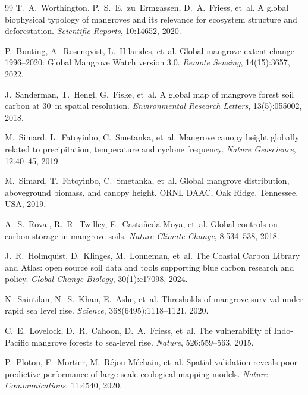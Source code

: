 \begin{thebibliography}{99}
T.~A.~Worthington, P.~S.~E.~zu~Ermgassen, D.~A.~Friess, et~al.
\newblock A global biophysical typology of mangroves and its relevance for ecosystem structure and deforestation.
\newblock \emph{Scientific Reports}, 10:14652, 2020.

P.~Bunting, A.~Rosenqvist, L.~Hilarides, et~al.
\newblock Global mangrove extent change 1996--2020: Global Mangrove Watch version 3.0.
\newblock \emph{Remote Sensing}, 14(15):3657, 2022.

J.~Sanderman, T.~Hengl, G.~Fiske, et~al.
\newblock A global map of mangrove forest soil carbon at 30~m spatial resolution.
\newblock \emph{Environmental Research Letters}, 13(5):055002, 2018.

M.~Simard, L.~Fatoyinbo, C.~Smetanka, et~al.
\newblock Mangrove canopy height globally related to precipitation, temperature and cyclone frequency.
\newblock \emph{Nature Geoscience}, 12:40--45, 2019.

M.~Simard, T.~Fatoyinbo, C.~Smetanka, et~al.
\newblock Global mangrove distribution, aboveground biomass, and canopy height.
\newblock ORNL DAAC, Oak Ridge, Tennessee, USA, 2019.

A.~S.~Rovai, R.~R.~Twilley, E.~Casta\~neda-Moya, et~al.
\newblock Global controls on carbon storage in mangrove soils.
\newblock \emph{Nature Climate Change}, 8:534--538, 2018.

J.~R.~Holmquist, D.~Klinges, M.~Lonneman, et~al.
\newblock The Coastal Carbon Library and Atlas: open source soil data and tools supporting blue carbon research and policy.
\newblock \emph{Global Change Biology}, 30(1):e17098, 2024.

N.~Saintilan, N.~S.~Khan, E.~Ashe, et~al.
\newblock Thresholds of mangrove survival under rapid sea level rise.
\newblock \emph{Science}, 368(6495):1118--1121, 2020.

C.~E.~Lovelock, D.~R.~Cahoon, D.~A.~Friess, et~al.
\newblock The vulnerability of Indo-Pacific mangrove forests to sea-level rise.
\newblock \emph{Nature}, 526:559--563, 2015.

P.~Ploton, F.~Mortier, M.~R\'ejou-M\'echain, et~al.
\newblock Spatial validation reveals poor predictive performance of large-scale ecological mapping models.
\newblock \emph{Nature Communications}, 11:4540, 2020.


\end{thebibliography}

